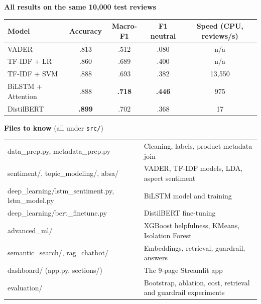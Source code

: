 \documentclass[10pt,a4paper]{article}
\begin{document}
\vspace{4pt}
\par\textbf{All results on the same 10,000 test reviews}\par\vspace{2pt}
\begin{tabularx}{\textwidth}{@{}Xcccc@{}}
\toprule
Model & Accuracy & Macro-F1 & F1 neutral & Speed (CPU, reviews/s) \\
\midrule
VADER & .813 & .512 & .080 & n/a \\
TF-IDF + LR & .860 & .689 & .400 & n/a \\
TF-IDF + SVM & .888 & .693 & .382 & 13,550 \\
BiLSTM + Attention & .888 & \textbf{.718} & \textbf{.446} & 975 \\
DistilBERT & \textbf{.899} & .702 & .368 & 17 \\
\bottomrule
\end{tabularx}

\vspace{4pt}
\par\textbf{Files to know} (all under \texttt{src/})\par\vspace{2pt}
\begin{tabularx}{\textwidth}{@{}>{\ttfamily\footnotesize\RaggedRight}p{6.4cm}>{\RaggedRight}X@{}}
data\_prep.py, metadata\_prep.py & Cleaning, labels, product metadata join \\
sentiment/, topic\_modeling/, absa/ & VADER, TF-IDF models, LDA, aspect sentiment \\
deep\_learning/lstm\_sentiment.py, lstm\_model.py & BiLSTM model and training \\
deep\_learning/bert\_finetune.py & DistilBERT fine-tuning \\
advanced\_ml/ & XGBoost helpfulness, KMeans, Isolation Forest \\
semantic\_search/, rag\_chatbot/ & Embeddings, retrieval, guardrail, answers \\
dashboard/ (app.py, sections/) & The 9-page Streamlit app \\
evaluation/ & Bootstrap, ablation, cost, retrieval and guardrail experiments \\
\bottomrule
\end{tabularx}
\end{document}
